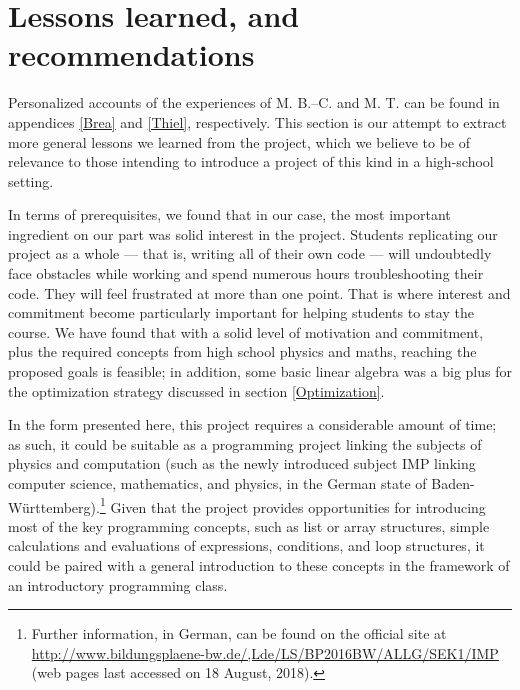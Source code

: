 \documentclass[11pt,twocolumn]{article}
\begin{document}

           
    \section{Lessons learned, and recommendations} \label{education}
    
Personalized accounts of the experiences of M. B.--C. and M. T. can be found in appendices \ref{Brea} and \ref{Thiel}, respectively. This section is our attempt to extract more general lessons we learned from the project, which we believe to be of relevance to those intending to introduce a project of this kind in a high-school setting. 
     
In terms of prerequisites, we found that in our case, the most important ingredient on our part was solid interest in the project. Students replicating our project as a whole --- that is, writing all of their own code --- will undoubtedly face obstacles while working and spend numerous hours troubleshooting their code. They will feel frustrated at more than one point. That is where interest and commitment become particularly important for helping students to stay the course. We have found that with a solid level of motivation and commitment, plus the required concepts from high school physics and maths, reaching the proposed goals is feasible; in addition, some basic linear algebra was a big plus for the optimization strategy discussed in section \ref{Optimization}. 

In the form presented here, this project requires a considerable amount of time; as such, it could be suitable as a programming project linking the subjects of physics and computation (such as the newly introduced subject IMP linking computer science, mathematics, and physics, in the German state of Baden-W{\"u}rttemberg).\footnote{
Further information, in German, can be found on the official site at \href{http://www.bildungsplaene-bw.de/,Lde/LS/BP2016BW/ALLG/SEK1/IMP}{http://www.bildungsplaene-bw.de/,Lde/LS/BP2016BW/ALLG/SEK1/IMP} (web pages last accessed on 18 August, 2018).
} Given that the project provides opportunities for introducing most of the key programming concepts, such as list or array structures, simple calculations and evaluations of expressions, conditions, and loop structures, it could be paired with a general introduction to these concepts in the framework of an introductory programming class. 
\end{document}
